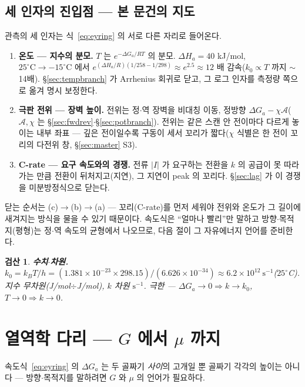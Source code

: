 \documentclass[11pt,a4paper]{article}
\newtheorem*{verifybox}{검산}
\begin{document}
\subsection{세 인자의 진입점 — 본 문건의 지도}
관측의 세 인자는 식~\eqref{eq:eyring} 의 서로 다른 자리로 들어온다.
\begin{enumerate}[label=\textbf{(\alph*)},leftmargin=2.2em,itemsep=2pt]
\item \textbf{온도 — 지수의 분모.} $T$ 는 $e^{-\Delta G_a/RT}$ 의 분모. $\Delta H_a=40$ kJ/mol, $25^\circ\mathrm C\to-15^\circ\mathrm C$ 에서 $e^{(\Delta H_a/R)(1/258-1/298)}\approx e^{2.5}\approx12$ 배 감속($k_0\propto T$ 까지 $\sim$14배). \S\ref{sec:tempbranch} 가 Arrhenius 회귀로 닫고, 그 로그 인자를 측정량 쪽으로 옮겨 명시 보정한다.
\item \textbf{극판 전위 — 장벽 높이.} 전위는 정$\cdot$역 장벽을 비대칭 이동, 정방향 $\Delta G_a-\chi\mathcal A$($\mathcal A,\chi$ 는 \S\ref{sec:fwdrev}$\cdot$\S\ref{sec:potbranch}). 전위는 같은 스캔 안 전이마다 다르게 놓이는 내부 좌표 — 깊은 전이일수록 구동이 세서 꼬리가 짧다($\chi$ 식별은 한 전이 꼬리의 다전위 창, \S\ref{sec:master} S3).
\item \textbf{C-rate — 요구 속도와의 경쟁.} 전류 $|I|$ 가 요구하는 전환을 $k$ 의 공급이 못 따라가는 만큼 전환이 뒤처지고(지연), 그 지연이 peak 의 꼬리다. \S\ref{sec:lag} 가 이 경쟁을 미분방정식으로 닫는다.
\end{enumerate}
닫는 순서는 (c)$\to$(b)$\to$(a) — 꼬리(C-rate)를 먼저 세워야 전위와 온도가 그 길이에 새겨지는 방식을 물을 수 있기 때문이다. 속도식은 ``얼마나 빨리''만 말하고 방향$\cdot$목적지(평형)는 정$\cdot$역 속도의 균형에서 나오므로, 다음 절이 그 자유에너지 언어를 준비한다.

\begin{verifybox}
\textbf{수치$\cdot$차원.} $k_0=k_BT/h=(1.381\times10^{-23}\times298.15)/(6.626\times10^{-34})
\approx6.2\times10^{12}\ \mathrm{s^{-1}}$($25^\circ$C). 지수 무차원(J/mol$\div$J/mol), $k$ 차원 $\mathrm{s^{-1}}$. 극한 — $\Delta G_a\to0\Rightarrow k\to k_0$, $T\to0\Rightarrow k\to0$.
\end{verifybox}

\section{열역학 다리 — $G$ 에서 $\mu$ 까지}\label{sec:thermo}
속도식~\eqref{eq:eyring} 의 $\Delta G_a$ 는 두 골짜기 \emph{사이}의 고개일 뿐 골짜기 각각의 높이는 아니다 — 방향$\cdot$목적지를 말하려면 $G$ 와 $\mu$ 의 언어가 필요하다.
\end{document}

